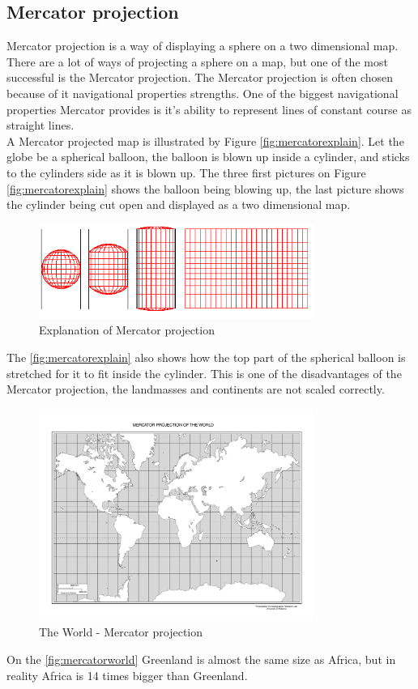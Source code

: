 \subsection*{Mercator projection}
Mercator projection is a way of displaying a sphere on a two dimensional map.
There are a lot of ways of projecting a sphere on a map, but one of the most successful is the Mercator projection. The Mercator projection is often chosen because of it navigational properties strengths. One of the biggest navigational properties Mercator provides is it's ability to represent lines of constant course as straight lines.\\
A Mercator projected map is illustrated by Figure  \autoref{fig:mercatorexplain}. Let the globe be a spherical balloon, the balloon is blown up inside a cylinder, and sticks to the cylinders side as it is blown up. The three first pictures on Figure \autoref{fig:mercatorexplain} shows the balloon being blowing up, the last picture shows the cylinder being cut open and displayed as a two dimensional map.
\begin{figure}[H]
\centering
\includegraphics[width=0.8\textwidth]{img/mercatorexplain.png}
\caption{Explanation of Mercator projection \citep{mercatorexplain}}
\label{fig:mercatorexplain}
\end{figure}
The \autoref{fig:mercatorexplain} also shows how the top part of the spherical balloon is stretched for it to fit inside the cylinder. This is one of the disadvantages of the Mercator projection, the landmasses and continents are not scaled correctly.
\begin{figure}[H]
\centering
\includegraphics[width=0.8\textwidth]{img/mercatorworld.pdf}
\caption{The World - Mercator projection  \citep{mercatorworld}}
\label{fig:mercatorworld}
\end{figure} On the \autoref{fig:mercatorworld} Greenland is almost the same size as Africa, but in reality Africa is 14 times bigger than Greenland.

